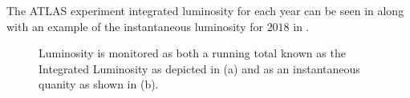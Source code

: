The ATLAS experiment integrated luminosity for each year can be seen in
 along with an example of the instantaneous luminosity
for $2018$ in .

\begin{figure}[!htbp] 
\centering
{}\hfill
{}\hfill
\caption{Luminosity is monitored as both a running total known as the Integrated
Luminosity as depicted in (a) and as an instantaneous quanity as shown in (b).}
\label{fig:luminosity} 
\end{figure}

